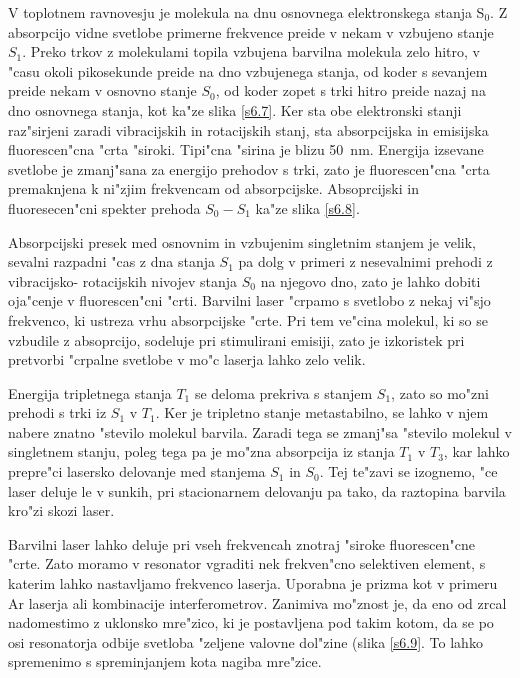 V toplotnem ravnovesju je molekula na dnu osnovnega elektronskega stanja S$_0
$. Z absorpcijo vidne svetlobe primerne frekvence preide v nekam v vzbujeno
stanje $S_1$. Preko trkov z molekulami topila vzbujena barvilna molekula
zelo hitro, v "casu okoli pikosekunde preide na dno vzbujenega stanja, od
koder s sevanjem preide nekam v osnovno stanje $S_0$, od koder zopet s trki
hitro preide nazaj na dno osnovnega stanja, kot ka"ze slika \ref{s6.7}. Ker
sta obe elektronski stanji raz"sirjeni zaradi vibracijskih in rotacijskih
stanj, sta absorpcijska in emisijska fluorescen"cna "crta "siroki. Tipi"cna
"sirina je blizu 50~nm. Energija izsevane svetlobe je zmanj"sana za energijo
prehodov s trki, zato je fluorescen"cna "crta premaknjena k ni"zjim
frekvencam od absorpcijske. Absoprcijski in fluoresecen"cni spekter prehoda $%
S_0-S_1$ ka"ze slika \ref{s6.8}.

Absorpcijski presek med osnovnim in vzbujenim singletnim stanjem je velik,
sevalni razpadni "cas z dna stanja $S_1$ pa dolg v primeri z nesevalnimi
prehodi z vibracijsko- rotacijskih nivojev stanja $S_0$ na njegovo dno, zato
je lahko dobiti oja"cenje v fluorescen"cni "crti. Barvilni laser "crpamo s
svetlobo z nekaj vi"sjo frekvenco, ki ustreza vrhu absorpcijske "crte. Pri
tem ve"cina molekul, ki so se vzbudile z absoprcijo, sodeluje pri
stimulirani emisiji, zato je izkoristek pri pretvorbi "crpalne svetlobe v
mo"c laserja lahko zelo velik.

Energija tripletnega stanja $T_1$ se deloma prekriva s stanjem $S_1$, zato
so mo"zni prehodi s trki iz $S_1$ v $T_1$. Ker je tripletno stanje
metastabilno, se lahko v njem nabere znatno "stevilo molekul barvila. Zaradi
tega se zmanj"sa "stevilo molekul v singletnem stanju, poleg tega pa je
mo"zna absorpcija iz stanja $T_1$ v $T_3$, kar lahko prepre"ci lasersko
delovanje med stanjema $S_1$ in $S_0$. Tej te"zavi se izognemo, "ce laser
deluje le v sunkih, pri stacionarnem delovanju pa tako, da raztopina barvila
kro"zi skozi laser.

Barvilni laser lahko deluje pri vseh frekvencah znotraj "siroke
fluorescen"cne "crte. Zato moramo v resonator vgraditi nek frekven"cno
selektiven element, s katerim lahko nastavljamo frekvenco laserja. Uporabna
je prizma kot v primeru Ar laserja ali kombinacije interferometrov. Zanimiva
mo"znost je, da eno od zrcal nadomestimo z uklonsko mre"zico, ki je
postavljena pod takim kotom, da se po osi resonatorja odbije svetloba
"zeljene valovne dol"zine (slika \ref{s6.9}. To lahko spremenimo s
spreminjanjem kota nagiba mre"zice.

